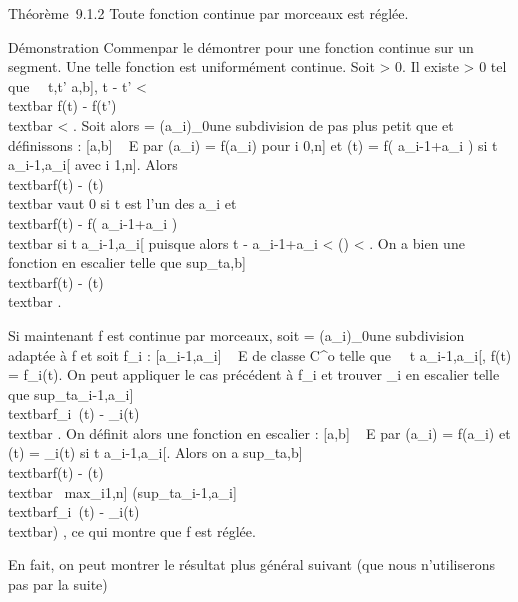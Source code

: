 \documentclass[]{article}
\begin{document}
Théorème~9.1.2 Toute fonction continue par morceaux est réglée.

Démonstration Commen\ccons par le démontrer pour une
fonction continue sur un segment. Une telle fonction est uniformément
continue. Soit \epsilon \textgreater{} 0. Il existe \eta \textgreater{} 0 tel que
\forall~~t,t' \in {[}a,b{]}, \textbar{}t - t'\textbar{}
\textless{} \eta \rigtharrow~\\textbar{} f(t) -
f(t')\\textbar{} \textless{} \epsilon. Soit alors \sigma =
(a\_i)\_0\leqi\leqn une subdivision de pas plus petit que \eta et
définissons \phi : {[}a,b{]} \rightarrow~ E par \phi(a\_i) = f(a\_i) pour
i \in {[}0,n{]} et \phi(t) = f( a\_i-1+a\_i
 ) si t \in{]}a\_i-1,a\_i{[} avec
i \in {[}1,n{]}. Alors \\textbar{}f(t) -
\phi(t)\\textbar{} vaut 0 si t est l'un des a\_i et
\\textbar{}f(t) - f( a\_i-1+a\_i
 )\\textbar{} \leq \epsilon si t
\in{]}a\_i-1,a\_i{[} puisque alors \textbar{}t -
a\_i-1+a\_i  \textbar{}
\textless{} \delta(\sigma) \textless{} \eta. On a bien une fonction \phi en escalier
telle que
sup\_t\in{[}a,b{]}~\\textbar{}f(t)
- \phi(t)\\textbar{} \leq \epsilon.

Si maintenant f est continue par morceaux, soit \sigma =
(a\_i)\_0\leqi\leqn une subdivision adaptée à f et soit
f\_i : {[}a\_i-1,a\_i{]} \rightarrow~ E de classe
C^o telle que \forall~~t
\in{]}a\_i-1,a\_i{[}, f(t) = f\_i(t). On peut
appliquer le cas précédent à f\_i et trouver \phi\_i en
escalier telle que
sup\_t\in{[}a\_i-1,a\_i{]}\\textbar{}f\_i~(t)
- \phi\_i(t)\\textbar{} \leq \epsilon. On définit alors une
fonction en escalier \phi : {[}a,b{]} \rightarrow~ E par \phi(a\_i) =
f(a\_i) et \phi(t) = \phi\_i(t) si t
\in{]}a\_i-1,a\_i{[}. Alors on a
sup\_t\in{[}a,b{]}~\\textbar{}f(t)
- \phi(t)\\textbar{} \leq\
max\_i\in{[}1,n{]}\left
(sup\_t\in{[}a\_i-1,a\_i{]}\\textbar{}f\_i~(t)
- \phi\_i(t)\\textbar{}\right ) \leq \epsilon,
ce qui montre que f est réglée.

En fait, on peut montrer le résultat plus général suivant (que nous
n'utiliserons pas par la suite)
\end{document}

